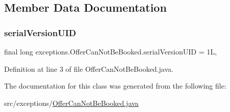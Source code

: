 \begin{DoxyCode}{0}

\end{DoxyCode}


\subsection{Member Data Documentation}
\mbox{\label{classexceptions_1_1OfferCanNotBeBooked_a0f0deac6a5fe9077f31bd1c90f1b0b59}} 
\subsubsection{\texorpdfstring{serialVersionUID}{serialVersionUID}}
{\footnotesize\ttfamily final long exceptions.\+Offer\+Can\+Not\+Be\+Booked.\+serial\+Version\+U\+ID = 1L\hspace{0.3cm}{\ttfamily [static]}, {\ttfamily [private]}}



Definition at line 3 of file Offer\+Can\+Not\+Be\+Booked.\+java.



The documentation for this class was generated from the following file\+:\begin{DoxyCompactItemize}
\item 
src/exceptions/\mbox{\hyperlink{OfferCanNotBeBooked_8java}{Offer\+Can\+Not\+Be\+Booked.\+java}}\end{DoxyCompactItemize}
